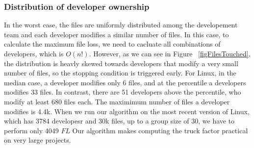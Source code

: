 \subsubsection{Distribution of developer ownership}
In the worst case, the files are uniformly distributed among the developement
team and each developer modifies a similar number of files. In this case, to
calculate the maximum file loss, we need to cacluate all combinations of
developers, which is $O(n!)$. However, as we can see in Figure
~\ref{figFilesTouched}, the distribution is heavly skewed towards developers
that modify a very small number of files, so the stopping condition is triggered
early. For Linux, in the median case, a developer modifies only 6 files, and at
the  percentile a developers modifies 33 files. In contrast, there are
51 developers above the  percentile, who modify at least 680 files each.
The maximimum number of files a developer modifies is 4.4k.
When we run our algorithm on the most recent version of Linux, which has 3784
developesr and 30k files, up to a group size of 30, we have to perform only
4049 $FL$
Our algorithm makes computing the truck factor practical on very large projects.




